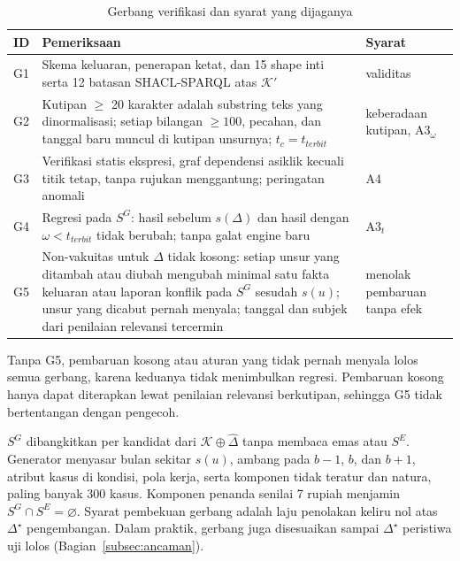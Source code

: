 \documentclass[conference]{IEEEtran}
\makeatletter
\DeclareRobustCommand{\en}[1]{{\usefont{\f@encoding}{\f@family}{\f@series}{it}#1\/}}
\newcommand{\K}{\mathcal{K}}
\newcommand{\emas}{\star}
\newcommand{\SG}{S^{G}}
\newcommand{\SE}{S^{E}}
\makeatother
\begin{document}
\begin{table}[t]
\centering
\caption{Gerbang verifikasi dan syarat yang dijaganya}
\label{tab:gerbang}
\scriptsize
\begin{tabularx}{\columnwidth}{@{}P{0.5cm} L P{1.3cm}@{}}
\toprule
\textbf{ID} & \textbf{Pemeriksaan} & \textbf{Syarat} \\
\midrule
G1 & Skema keluaran, penerapan ketat, dan 15 \en{shape} inti serta 12 batasan SHACL-SPARQL atas $\K'$ & validitas \\
G2 & Kutipan $\geq$ 20 karakter adalah \en{substring} teks yang dinormalisasi; setiap bilangan $\geq 100$, pecahan, dan tanggal baru muncul di kutipan unsurnya; $t_c = t_{\mathit{terbit}}$ & keberadaan kutipan, A3$_\omega$ \\
G3 & Verifikasi statis ekspresi, graf dependensi asiklik kecuali titik tetap, tanpa rujukan menggantung; peringatan anomali & A4 \\
G4 & Regresi pada $\SG$: hasil sebelum $s(\Delta)$ dan hasil dengan $\omega < t_{\mathit{terbit}}$ tidak berubah; tanpa galat \en{engine} baru & A3$_t$ \\
G5 & Non-vakuitas untuk $\Delta$ tidak kosong: setiap unsur yang ditambah atau diubah mengubah minimal satu fakta keluaran atau laporan konflik pada $\SG$ sesudah $s(u)$; unsur yang dicabut pernah menyala; tanggal dan subjek dari penilaian relevansi tercermin & menolak pembaruan tanpa efek \\
\bottomrule
\end{tabularx}
\end{table}

Tanpa G5, pembaruan kosong atau aturan yang tidak pernah menyala lolos semua gerbang, karena keduanya tidak menimbulkan regresi. Pembaruan kosong hanya dapat diterapkan lewat penilaian relevansi berkutipan, sehingga G5 tidak bertentangan dengan pengecoh.

$\SG$ dibangkitkan per kandidat dari $\K \oplus \hat{\Delta}$ tanpa membaca emas atau $\SE$. Generator menyasar bulan sekitar $s(u)$, ambang pada $b-1$, $b$, dan $b+1$, atribut kasus di kondisi, pola kerja, serta komponen tidak teratur dan natura, paling banyak 300 kasus. Komponen penanda senilai 7 rupiah menjamin $\SG \cap \SE = \varnothing$. Syarat pembekuan gerbang adalah laju penolakan keliru nol atas $\Delta^{\emas}$ pengembangan. Dalam praktik, gerbang juga disesuaikan sampai $\Delta^{\emas}$ peristiwa uji lolos (Bagian~\ref{subsec:ancaman}).
\end{document}
